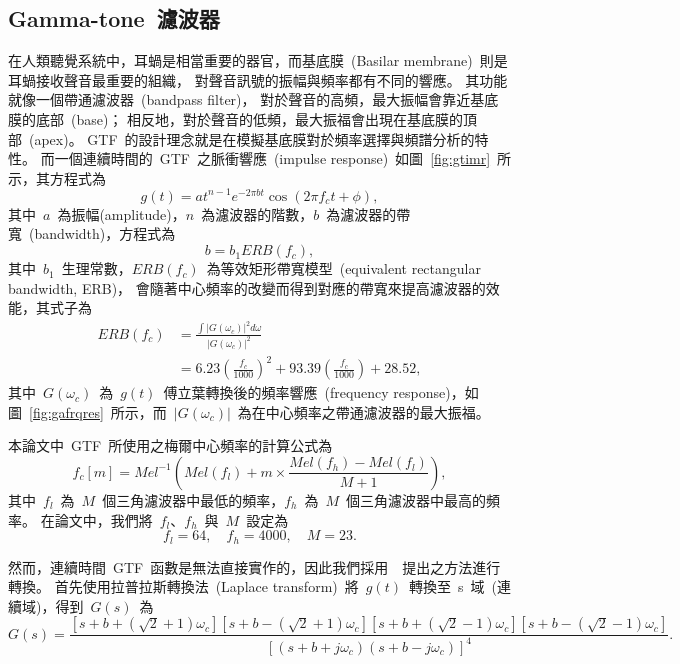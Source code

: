 \subsection{Gamma-tone~濾波器}
\label{sec:gammafilter}
在人類聽覺系統中，耳蝸是相當重要的器官，而基底膜~(Basilar membrane)~則是耳蝸接收聲音最重要的組織，
對聲音訊號的振幅與頻率都有不同的響應。
其功能就像一個帶通濾波器~(bandpass filter)，
對於聲音的高頻，最大振幅會靠近基底膜的底部~(base)；
相反地，對於聲音的低頻，最大振福會出現在基底膜的頂部~(apex)。
GTF~的設計理念就是在模擬基底膜對於頻率選擇與頻譜分析的特性。
而一個連續時間的~GTF~之脈衝響應~(impulse response)~如圖~\ref{fig:gtimr}~所示，其方程式為
\begin{equation}
  g(t) = at^{n-1} e^{-2 \pi bt} \cos (2 \pi f_c t + \phi),
\end{equation}
其中~$a$~為振幅(amplitude)，$n$~為濾波器的階數，$b$~為濾波器的帶寬~(bandwidth)，方程式為
\begin{equation}
	b = b_1 ERB(f_c),
\end{equation}	
其中~$b_1$~生理常數，$ERB(f_c)$~為等效矩形帶寬模型~(equivalent rectangular bandwidth, ERB)，
會隨著中心頻率的改變而得到對應的帶寬來提高濾波器的效能，其式子為
\begin{equation}	
  \begin{aligned}
    ERB(f_c) &= \frac{\int|G(\omega_c)|^2 d\omega}{|G(\omega_c)|^2}  \\
			 &= 6.23(\frac{f_c}{1000})^2+93.39(\frac{f_c}{1000})+28.52,
    \end{aligned}
  \end{equation}  
其中~$G(\omega_c)$~為~$g(t)$~傅立葉轉換後的頻率響應~(frequency response)，如圖~\ref{fig:gafrqres}~所示，而~$|G(\omega_c)|$~為在中心頻率之帶通濾波器的最大振福。 

本論文中~GTF~所使用之梅爾中心頻率的計算公式為
\begin{equation}
\label{eq:melfreq}
  f_c[m] = Mel^{-1} \left( Mel(f_l) + m \times \frac{Mel(f_h)-Mel(f_l)}{M+1} \right),
\end{equation}
其中~$f_l$~為~$M$~個三角濾波器中最低的頻率，$f_h$~為~$M$~個三角濾波器中最高的頻率。
在論文中，我們將~$f_l$、$f_h$~與~$M$~設定為
\[
	f_l = 64, \quad f_h = 4000, \quad M = 23.
\]

然而，連續時間~GTF~函數是無法直接實作的，因此我們採用~\cite{Slaney1993}~提出之方法進行轉換。
首先使用拉普拉斯轉換法~(Laplace transform)~將~$g(t)$~轉換至~s~域~(連續域)，得到~$G(s)$~為
\begin{equation}
\label{eq:gs}
	G(s) = \frac{ \left[ s + b + \left( \sqrt{2} + 1 \right) \omega_c \right] 
		          \left[ s + b - \left( \sqrt{2} + 1 \right) \omega_c \right]
		          \left[ s + b + \left( \sqrt{2} - 1 \right) \omega_c \right]
		          \left[ s + b - \left( \sqrt{2} - 1 \right) \omega_c \right]}
		    { \left[ \left( s + b + j \omega_c \right) \left( s + b - j \omega_c \right) \right]^4}.
\end{equation}

